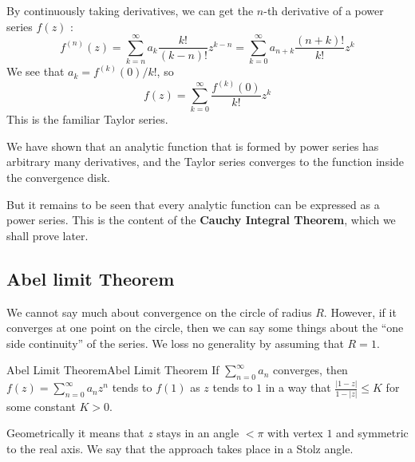 \documentclass[../main.tex]{subfiles}
\begin{document}
By continuously taking derivatives, we can get the $n$-th derivative of a power series $f(z)$ :
\begin{equation*}
	f^{(n)}(z) = \sum_{k=n}^{\infty } a_k \frac{k!}{(k-n)!} z^{k-n} = \sum_{k=0}^{\infty } a_{n+k} \frac{(n+k)!}{k!} z^k
\end{equation*}
We see that $a_k = f^{(k)}(0) / k!$, so
\begin{equation*}
	f(z) = \sum_{k=0}^{\infty } \frac{f^{(k)}(0)}{k!} z^k
\end{equation*}	
This is the familiar Taylor series.
\begin{remark}
We have shown that an analytic function that is formed by power series has arbitrary many derivatives, and the Taylor series converges to the function inside the convergence disk.

But it remains to be seen that every analytic function can be expressed as a power series. This is the content of the \textbf{Cauchy Integral Theorem}, which we shall prove later.
\end{remark}

\subsection{Abel limit Theorem}

We cannot say much about convergence on the circle of radius $R$. However, if it converges at one point on the circle, then we can say some things about the ``one side continuity'' of the series. We loss no generality by assuming that $R=1$.

\begin{theorem}{Abel Limit Theorem}{Abel Limit Theorem}
If $\displaystyle \sum_{n=0}^{\infty } a_n$ converges, then $\displaystyle f(z) = \sum_{n=0}^{\infty } a_nz^n$ tends to $f(1)$ as $z$ tends to $1$ in a way that $\displaystyle \frac{\left|1-z\right|}{1-\left|z\right|} \leq K$ for some constant $K>0$.
\end{theorem}
Geometrically it means that $z$ stays in an angle $<\pi$ with vertex $1$ and symmetric to the real axis. We say that the approach takes place in a Stolz angle.
\end{document}
